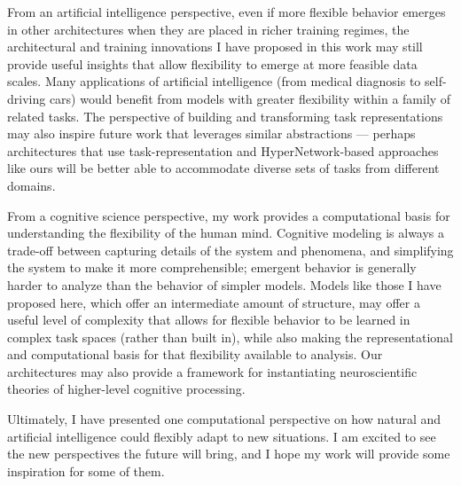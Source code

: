 From an artificial intelligence perspective, even if more flexible behavior emerges in other architectures when they are placed in richer training regimes, the architectural and training innovations I have proposed in this work may still provide useful insights that allow flexibility to emerge at more feasible data scales. Many applications of artificial intelligence (from medical diagnosis to self-driving cars) would benefit from models with greater flexibility within a family of related tasks. The perspective of building and transforming task representations may also inspire future work that leverages similar abstractions --- perhaps architectures that use task-representation and HyperNetwork-based approaches like ours will be better able to accommodate diverse sets of tasks from different domains. \par 

From a cognitive science perspective, my work provides a computational basis for understanding the flexibility of the human mind. Cognitive modeling is always a trade-off between capturing details of the system and phenomena, and simplifying the system to make it more comprehensible; emergent behavior is generally harder to analyze than the behavior of simpler models. Models like those I have proposed here, which offer an intermediate amount of structure, may offer a useful level of complexity that allows for flexible behavior to be learned in complex task spaces (rather than built in), while also making the representational and computational basis for that flexibility available to analysis. Our architectures may also provide a framework for instantiating neuroscientific theories of higher-level cognitive processing. \par 

Ultimately, I have presented one computational perspective on how natural and artificial intelligence could flexibly adapt to new situations. I am excited to see the new perspectives the future will bring, and I hope my work will provide some inspiration for some of them. 
